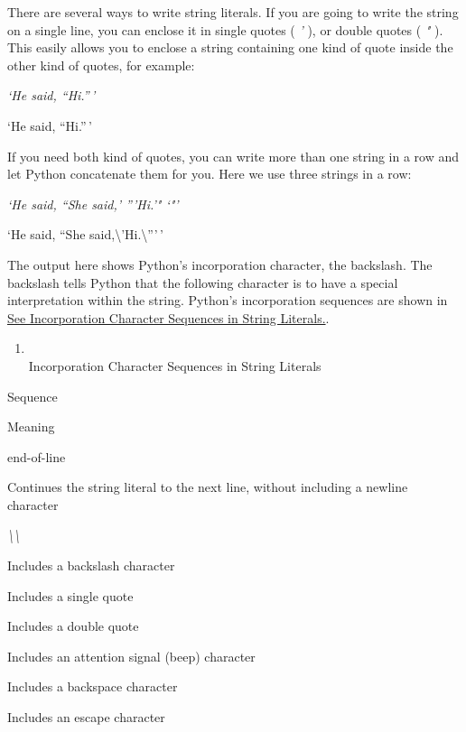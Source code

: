 There are several ways to write
string literals. If you are going to write the string on a single line,
you can enclose it in single quotes ( \emph{'} ), or double quotes (
\emph{"} ). This easily allows you to enclose a string containing one
kind of quote inside the other kind of quotes, for example:


\emph{`He said, ``Hi.''\,'}

`He said, ``Hi.''\,'

If you need both kind of quotes,
you can write more than one string in a row and let Python concatenate
them for you. Here we use three strings in a row:


\emph{`He said, ``She said,' '''Hi.'" `"'}

`He said, ``She
said,\textbackslash{}'Hi.\textbackslash{}'''\,'

The output here shows Python's
incorporation character, the backslash. The backslash tells Python that
the following character is to have a special interpretation within the
string. Python's incorporation sequences are shown in
\href{chap2.html\#44479}{See Incorporation Character Sequences in String
Literals.}.

\begin{enumerate}

\item
  \\
  Incorporation Character Sequences in
  String Literals
\end{enumerate}

Sequence

Meaning


end-of-line

Continues the string literal to the
next line, without including a newline character


\emph{\textbackslash{}\textbackslash{}}

Includes a backslash character



Includes a single quote



Includes a double quote



Includes an attention signal (beep)
character



Includes a backspace character



Includes an escape character



